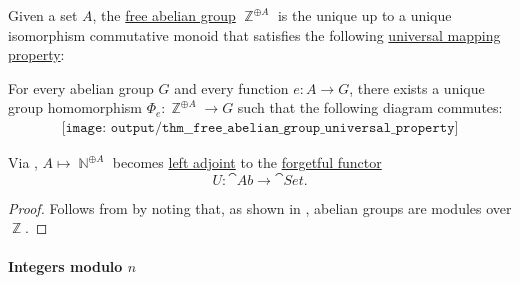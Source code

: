 \begin{theorem}\label{thm:free_abelian_group_universal_property}
  Given a set \( A \), the \hyperref[def:free_abelian_group]{free abelian group} \( \BbbZ^{\oplus A} \) is the unique up to a unique isomorphism commutative monoid that satisfies the following \hyperref[rem:universal_mapping_property]{universal mapping property}:
  \begin{displayquote}
    For every abelian group \( G \) and every function \( e: A \to G \), there exists a unique group homomorphism \( \Phi_e: \BbbZ^{\oplus A} \to G \) such that the following diagram commutes:
    \begin{equation}\label{eq:thm:free_abelian_group_universal_property/diagram}
      \begin{aligned}
        \texttt{[image: output/thm\_\_free\_abelian\_group\_universal\_property]}
      \end{aligned}
    \end{equation}
  \end{displayquote}
\end{theorem}
\begin{comments}
  \item Via , \( A \mapsto \BbbN^{\oplus A} \) becomes \hyperref[def:category_adjunction]{left adjoint} to the \hyperref[def:concrete_category]{forgetful functor}
  \begin{equation*}
    U: \cat{Ab} \to \cat{Set}.
  \end{equation*}
\end{comments}
\begin{proof}
  Follows from  by noting that, as shown in , abelian groups are modules over \( \BbbZ \).
\end{proof}

\paragraph{Integers modulo \( n \)}

